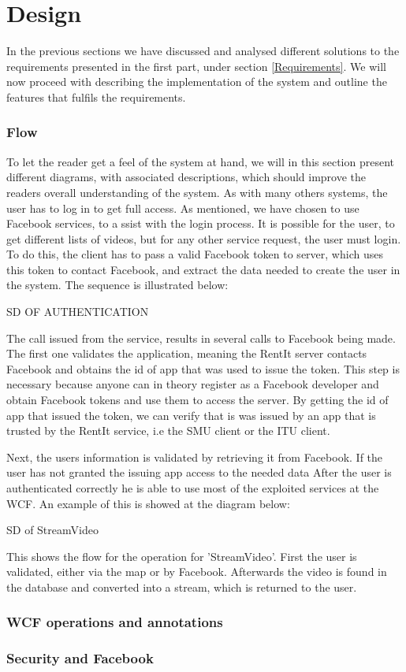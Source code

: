 \part{Design}
In the previous sections we have discussed and analysed different solutions to the requirements presented in the first part, under section \ref{Requirements}. We will now proceed with describing the implementation of the system and outline the features that fulfils the requirements.

\section{Flow}
To let the reader get a feel of the system at hand, we will in this section present different diagrams, with associated descriptions, which should improve the readers overall understanding of the system.
As with many others systems, the user has to log in to get full access. As mentioned, we have chosen to use Facebook services, to a ssist with the login process. It is possible for the user, to get different lists of videos, but for any other service request, the user must login. To do this, the client has to pass a valid Facebook token to server, which uses this token to contact Facebook, and extract the data needed to create the user in the system. The sequence is illustrated below:

SD OF AUTHENTICATION

The call issued from the service, results in several calls to Facebook being made. The first one validates the application, meaning the RentIt server contacts Facebook and obtains the id of app that was used to issue the token. This step is necessary because anyone can in theory register as a Facebook developer and obtain Facebook tokens and use them to access the server. By getting the id of app that issued the token, we can verify that is was issued by an app that is trusted by the RentIt service, i.e the SMU client or the ITU client.

Next, the users information is validated by retrieving it from Facebook. If the user has not granted the issuing app access to the needed data
After the user is authenticated correctly he is able to use most of the exploited services at the WCF. An example of this is showed at the diagram below:

SD of StreamVideo

This shows the flow for the operation for 'StreamVideo'. First the user is validated, either via the map or by Facebook. Afterwards the video is found in the database and converted into a stream, which is returned to the user. 


\section{WCF operations and annotations}


\section{Security and Facebook}



